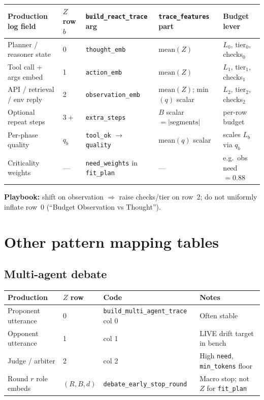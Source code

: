 \documentclass[11pt]{article}
\begin{document}
\begin{center}
\small
\begin{tabular}{@{}p{}p{}p{}p{}p{}@{}}
\toprule
Production log field & $Z$ row $b$ & \texttt{build\_react\_trace} arg & \texttt{trace\_features} part & Budget lever \\
\midrule
Planner / reasoner state & 0 & \texttt{thought\_emb} & $\mathrm{mean}(Z)$ & $L_0$, tier$_0$, checks$_0$ \\
Tool call + args embed & 1 & \texttt{action\_emb} & $\mathrm{mean}(Z)$ & $L_1$, tier$_1$, checks$_1$ \\
API / retrieval / env reply & 2 & \texttt{observation\_emb} & $\mathrm{mean}(Z)$; min$(q)$ scalar & $L_2$, tier$_2$, checks$_2$ \\
Optional repeat steps & $3+$ & \texttt{extra\_steps} & $B$ scalar $=|\text{segments}|$ & per-row budget \\
Per-phase quality & $q_b$ & \texttt{tool\_ok} $\rightarrow$ \texttt{quality} & mean$(q)$ scalar & scales $L_b$ via $q_b$ \\
Criticality weights & --- & \texttt{need\_weights} in \texttt{fit\_plan} & --- & e.g.\ obs need $=0.88$ \\
\bottomrule
\end{tabular}
\end{center}

\noindent\textbf{Playbook:} shift on observation $\Rightarrow$ raise checks/tier on row~2; do not uniformly inflate row~0 (``Budget Observation vs Thought'').

\section{Other pattern mapping tables}

\subsection{Multi-agent debate}
\begin{center}
\small
\begin{tabular}{@{}llll@{}}
\toprule
Production & $Z$ row & Code & Notes \\
\midrule
Proponent utterance & 0 & \texttt{build\_multi\_agent\_trace} col 0 & Often stable \\
Opponent utterance & 1 & col 1 & LIVE drift target in bench \\
Judge / arbiter & 2 & col 2 & High \texttt{need}, \texttt{min\_tokens} floor \\
Round $r$ role embeds & $(R,B,d)$ & \texttt{debate\_early\_stop\_round} & Macro stop; not $Z$ for \texttt{fit\_plan} \\
\bottomrule
\end{tabular}
\end{center}
\end{document}
